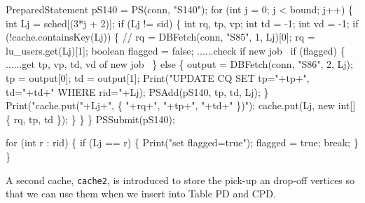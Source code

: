 \documentclass{article}
\def\nwendcode{\endtrivlist \endgroup}      %
\let\nwdocspar=\par
\theoremstyle{definition}                   %
\begin{document}
PreparedStatement pS140 = PS(conn, "S140");
for (int j = 0; j < bound; j++) \{
  int Lj = sched[(3*j + 2)];
  if (Lj != sid) \{
    int rq, tp, vp;
    int td = -1;
    int vd = -1;
    if (!cache.containsKey(Lj)) \{
      // rq = DBFetch(conn, "S85", 1, Lj)[0];
      rq = lu_users.get(Lj)[1];
      boolean flagged = false;
      \LA{}......check if new job~{\nwtagstyle{}}\RA{}
      if (flagged) \{
        \LA{}......get tp, vp, td, vd of new job~{\nwtagstyle{}}\RA{}
      \} else \{
        output = DBFetch(conn, "S86", 2, Lj);
        tp = output[0];
        td = output[1];
        Print("UPDATE CQ SET tp="+tp+", td="+td+" WHERE rid="+Lj);
        PSAdd(pS140, tp, td, Lj);
      \}
      Print("cache.put("+Lj+", \{ "+rq+", "+tp+", "+td+" \})");
      cache.put(Lj, new int[] \{ rq, tp, td \});
    \}
  \}
\}
PSSubmit(pS140);
\nwendcode{}\nwdocspar
\nwenddocs{}\endmoddef{}
for (int r : rid) \{
  if (Lj == r) \{
    Print("set flagged=true");
    flagged = true;
    break;
  \}
\}
\nwendcode{}\nwdocspar
A second cache, {\tt{}cache2}, is introduced to store the pick-up an drop-off
vertices so that we can use them when we insert into Table PD and CPD.
\nwenddocs{}\endmoddef{}
\end{document}
